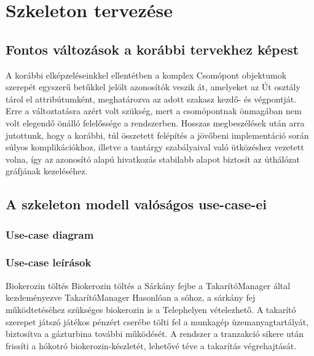 \chapter{Szkeleton tervezése}

\section{Fontos változások a korábbi tervekhez képest}
\par{A korábbi elképzeléseinkkel ellentétben a komplex Csomópont objektumok szerepét egyszerű betűkkel jelölt azonosítók veszik át, amelyeket az Út osztály tárol el attribútumként, meghatározva az adott szakasz kezdő- és végpontját. Erre a változtatásra azért volt szükség, mert a csomópontnak önmagában nem volt elegendő önálló felelőssége a rendszerben. Hosszas megbeszélések után arra jutottunk, hogy a korábbi, túl összetett felépítés a jövőbeni implementáció során súlyos komplikációkhoz, illetve a tantárgy szabályaival való ütközéshez vezetett volna, így az azonosító alapú hivatkozás stabilabb alapot biztosít az úthálózat gráfjának kezeléséhez.}

\section{A szkeleton modell valóságos use-case-ei}
\subsection{Use-case diagram}
\clearpage

\subsection{Use-case leírások}

\begin{use-case}
    {Biokerozin töltés}
    {Biokerozin töltés a Sárkány fejbe a TakarítóManager által kezdeményezve}
    {TakarítóManager}
    Hasonlóan a sóhoz, a sárkány fej működtetéséhez szükséges biokerozin is a Telephelyen vételezhető. A takarító szerepet játszó játékos pénzért cserébe tölti fel a munkagép üzemanyagtartályát, biztosítva a gázturbina további működését. A rendszer a tranzakció sikere után frissíti a hókotró biokerozin-készletét, lehetővé téve a takarítás végrehajtását.
\end{use-case}

